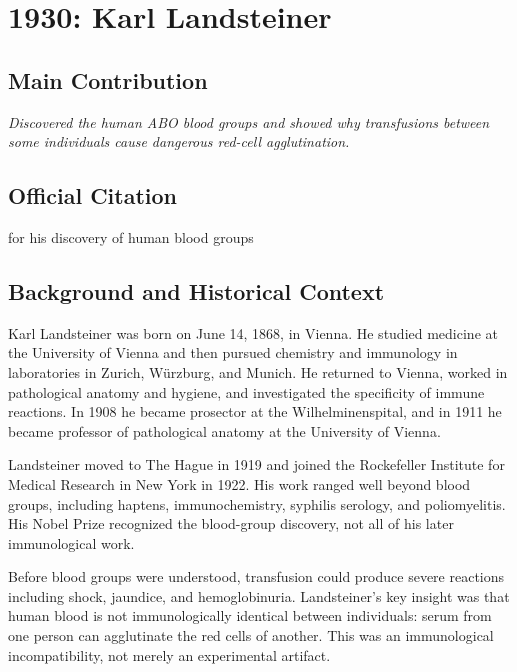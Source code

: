 \chapter[1930 --- Landsteiner]{1930: Karl Landsteiner}
\label{ch:1930_karllandsteiner}

\section*{Main Contribution}

\textit{Discovered the human ABO blood groups and showed why transfusions between some individuals cause dangerous red-cell agglutination.}\cite{nobel-1930,lecture-1930}

\section{Official Citation}

for his discovery of human blood groups\cite{nobel-1930}

\section{Background and Historical Context}

Karl Landsteiner was born on June 14, 1868, in Vienna. He studied medicine at the University of Vienna and then pursued chemistry and immunology in laboratories in Zurich, Würzburg, and Munich. He returned to Vienna, worked in pathological anatomy and hygiene, and investigated the specificity of immune reactions. In 1908 he became prosector at the Wilhelminenspital, and in 1911 he became professor of pathological anatomy at the University of Vienna.

Landsteiner moved to The Hague in 1919 and joined the Rockefeller Institute for Medical Research in New York in 1922. His work ranged well beyond blood groups, including haptens, immunochemistry, syphilis serology, and poliomyelitis. His Nobel Prize recognized the blood-group discovery, not all of his later immunological work.

Before blood groups were understood, transfusion could produce severe reactions including shock, jaundice, and hemoglobinuria. Landsteiner's key insight was that human blood is not immunologically identical between individuals: serum from one person can agglutinate the red cells of another. This was an immunological incompatibility, not merely an experimental artifact.

